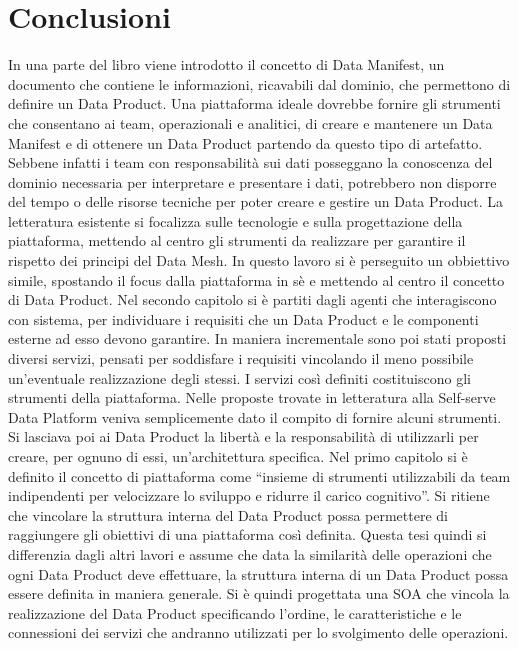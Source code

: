 \documentclass[12pt]{report}
\begin{document}
\chapter*{Conclusioni}
In una parte del libro \cite{dehghani_data_2022} viene introdotto il concetto di Data Manifest, un documento che contiene le informazioni, ricavabili dal dominio, che permettono di definire un Data Product.
Una piattaforma ideale dovrebbe fornire gli strumenti che consentano ai team, operazionali e analitici, di creare e mantenere un Data Manifest e di ottenere un Data Product partendo da questo tipo di artefatto.
Sebbene infatti i team con responsabilità sui dati posseggano la conoscenza del dominio necessaria per interpretare e presentare i dati, potrebbero non disporre del tempo o delle risorse tecniche per poter creare e gestire un Data Product. 
La letteratura esistente si focalizza sulle tecnologie e sulla progettazione della piattaforma, mettendo al centro gli strumenti da realizzare per garantire il rispetto dei principi del Data Mesh.
In questo lavoro si è perseguito un obbiettivo simile, spostando il focus dalla piattaforma in sè e mettendo al centro il concetto di Data Product.
Nel secondo capitolo si è partiti dagli agenti che interagiscono con sistema, per individuare i requisiti che un Data Product e le componenti esterne ad esso devono garantire.
In maniera incrementale sono poi stati proposti diversi servizi, pensati per soddisfare i requisiti vincolando il meno possibile un'eventuale realizzazione degli stessi.
I servizi così definiti costituiscono gli strumenti della piattaforma.
Nelle proposte trovate in letteratura alla Self-serve Data Platform veniva semplicemente dato il compito di fornire alcuni strumenti.
Si lasciava poi ai Data Product la libertà e la responsabilità di utilizzarli per creare, per ognuno di essi, un'architettura specifica. 
Nel primo capitolo si è definito il concetto di piattaforma come ``insieme di strumenti utilizzabili da team indipendenti per velocizzare lo sviluppo e ridurre il carico cognitivo''.
Si ritiene che vincolare la struttura interna del Data Product possa permettere di raggiungere gli obiettivi di una piattaforma così definita.
Questa tesi quindi si differenzia dagli altri lavori e assume che data la similarità delle operazioni che ogni Data Product deve effettuare, la struttura interna di un Data Product possa essere definita in maniera generale.
Si è quindi progettata una SOA che vincola la realizzazione del Data Product specificando l'ordine, le caratteristiche e le connessioni dei servizi che andranno utilizzati per lo svolgimento delle operazioni.
\end{document}
